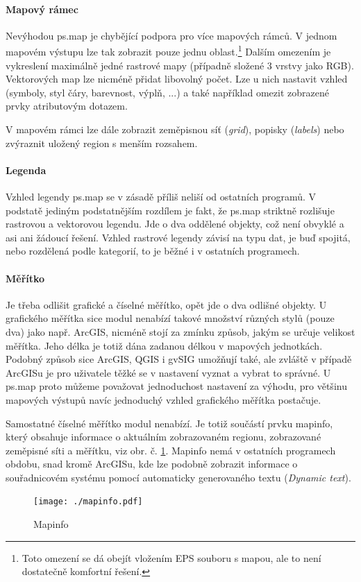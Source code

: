 \documentclass[a4paper,12pt,draft]{article}
\begin{document}
\paragraph*{Mapový rámec}
Nevýhodou ps.map je chybějící podpora pro více mapových
rámců. V jednom mapovém výstupu lze tak zobrazit pouze jednu
oblast.\footnote{Toto omezení se dá obejít vložením EPS souboru s mapou,
ale to není dostatečně komfortní řešení.} Dalším omezením je
vykreslení maximálně jedné rastrové mapy (případně složené 3 vrstvy
jako RGB). Vektorových map lze nicméně přidat libovolný počet. Lze u
nich nastavit vzhled (symboly, styl čáry, barevnost, výplň, ...) a také
například omezit zobrazené prvky atributovým dotazem.

V mapovém rámci lze dále zobrazit zeměpisnou síť (\emph{grid}), popisky
(\emph{labels}) nebo zvýraznit uložený region s menším rozsahem.

\paragraph*{Legenda}
Vzhled legendy ps.map se v zásadě příliš neliší od ostatních
programů. V podstatě jediným podstatnějším rozdílem je fakt, že
ps.map striktně rozlišuje rastrovou a vektorovou legendu. Jde o dva
oddělené objekty, což není obvyklé a asi ani žádoucí řešení. Vzhled
rastrové legendy závisí na typu dat, je buď spojitá, nebo rozdělená
podle kategorií, to je běžné i v ostatních programech.

\paragraph*{Měřítko}
Je třeba odlišit grafické a číselné měřítko, opět jde o dva
odlišné objekty.
U grafického měřítka sice modul nenabízí takové množství různých
stylů (pouze dva) jako např. ArcGIS, nicméně stojí za zmínku způsob,
jakým se určuje velikost měřítka. Jeho délka je totiž dána zadanou
délkou v mapových jednotkách. Podobný způsob sice ArcGIS, QGIS i gvSIG
umožňují také, ale zvláště v případě ArcGISu je pro uživatele
těžké se v nastavení vyznat a vybrat to správné. U ps.map proto
můžeme považovat jednoduchost nastavení za výhodu, pro většinu mapových
výstupů navíc jednoduchý vzhled grafického měřítka postačuje.

Samostatné číselné měřítko modul nenabízí. Je totiž součástí
prvku mapinfo, který obsahuje informace o aktuálním
zobrazovaném regionu, zobrazované zeměpisné síti a měřítku, viz
obr. č. \ref{fig:mapinfo}. Mapinfo nemá v ostatních programech obdobu,
snad kromě ArcGISu, kde lze podobně zobrazit informace o souřadnicovém
systému pomocí automaticky generovaného textu (\emph{Dynamic text}).
\begin{figure}[h!]
    \centering
    \texttt{[image: ./mapinfo.pdf]}
    \caption{Mapinfo}
    \label{fig:mapinfo}
\end{figure}
\end{document}
